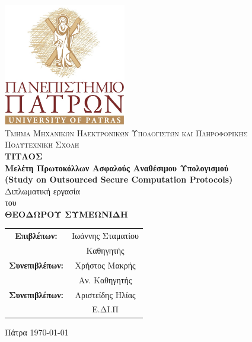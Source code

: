 \begin{titlepage}
    \begin{center}
        \includegraphics[width=0.4\textwidth]{00_preamble/images/upatras.jpg}
        \vspace*{1cm}
        \\ \textsc{Τμήμα Μηχανικών Ηλεκτρονικών Υπολογιστών και Πληροφορικής
        \\Πολυτεχνική Σχολή}
        \vspace{0.3cm}
    \large{
    \textbf{\\ΤΙΤΛΟΣ \\ Μελέτη Πρωτοκόλλων Ασφαλούς Αναθέσιμου Υπολογισμού \\ (Study on Outsourced Secure Computation Protocols)}}
        \vspace{0.5cm}
        \\Διπλωματική εργασία \\
        του\\
        \vspace{0.5cm}
        \textbf{ΘΕΟΔΩΡΟΥ ΣΥΜΕΩΝΙΔΗ}\\
        \vspace{1cm}
        
    \end{center}
    \begin{center}
        \begin{tabular}{ c c } 
            \textbf{Επιβλέπων:} & Ιωάννης Σταματίου \\ 
              & Καθηγητής  \\
            \textbf{Συνεπιβλέπων:} & Χρήστος Μακρής  \\ 
              & Αν. Καθηγητής \\ 
            \textbf{Συνεπιβλέπων:} & Αριστείδης Ηλίας \\ 
              & Ε.ΔΙ.Π \\ 

        \end{tabular}
    \end{center}
    \begin{center}
        \vfill
        Πάτρα \today
    \end{center}

\end{titlepage}